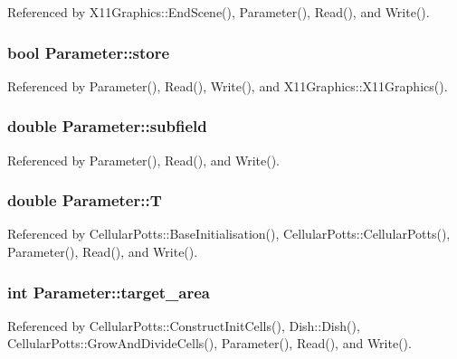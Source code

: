 Referenced by X11\-Graphics\-::\-End\-Scene(), Parameter(), Read(), and Write().

\subsubsection[{store}]{\setlength{\rightskip}{0pt plus 5cm}bool Parameter\-::store}\label{classParameter_a080a32bb479e647562cacf5f201c3693}


Referenced by Parameter(), Read(), Write(), and X11\-Graphics\-::\-X11\-Graphics().

\subsubsection[{subfield}]{\setlength{\rightskip}{0pt plus 5cm}double Parameter\-::subfield}\label{classParameter_ad61ae689dbc8e7af94a677ce5f045d4b}


Referenced by Parameter(), Read(), and Write().

\subsubsection[{T}]{\setlength{\rightskip}{0pt plus 5cm}double Parameter\-::\-T}\label{classParameter_a7aa07d76341e5333f7d264d197f2ed97}


Referenced by Cellular\-Potts\-::\-Base\-Initialisation(), Cellular\-Potts\-::\-Cellular\-Potts(), Parameter(), Read(), and Write().

\subsubsection[{target\-\_\-area}]{\setlength{\rightskip}{0pt plus 5cm}int Parameter\-::target\-\_\-area}\label{classParameter_acea77fed0fddbdedffb23983329dba08}


Referenced by Cellular\-Potts\-::\-Construct\-Init\-Cells(), Dish\-::\-Dish(), Cellular\-Potts\-::\-Grow\-And\-Divide\-Cells(), Parameter(), Read(), and Write().

